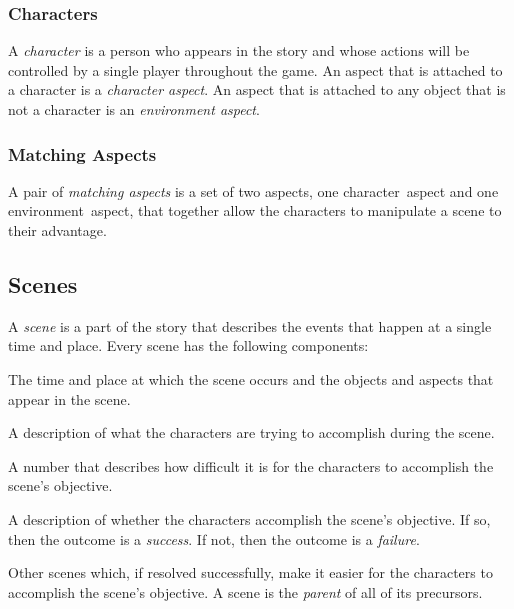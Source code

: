 \documentclass[12pt, a5paper, parskip=half-]{scrartcl}
\begin{document}
\subsubsection*{Characters}
A \emph{character} is a person who appears in the story and whose actions will be controlled by a single player throughout the game. 
An aspect that is attached to a character is a \emph{character aspect}.
An aspect that is attached to any object that is not a character is an \emph{environment aspect}.

\subsubsection*{Matching Aspects}
A pair of \emph{matching aspects} is a set of two aspects, one character~aspect and one environment~aspect, that together allow the characters to manipulate a scene to their advantage.

\newpage

\subsection*{Scenes}
A \emph{scene} is a part of the story that describes the events that happen at a single time and place.
Every scene has the following components:
\begin{description}[labelindent=0.25cm, leftmargin=\widthof{\hspace{0.25cm}\textbullet\space}, font=\normalfont\textbullet\bfseries\space]%
  \item[Setting]
  The time and place at which the scene occurs and the objects and aspects that appear in the scene.
  \item[Objective]
    A description of what the characters are trying to accomplish during the scene.
  \item[Difficulty Rating]
    A number that describes how difficult it is for the characters to accomplish the scene's objective.
  \item[Outcome]
    A description of whether the characters accomplish the scene's objective. If so, then the outcome is a \emph{success}.  If not, then the outcome is a \emph{failure}.
  \item[Precursors]
    Other scenes which, if resolved successfully, make it easier for the characters to accomplish the scene's objective.
    A scene is the \emph{parent} of all of its precursors.
\end{description}
\end{document}
